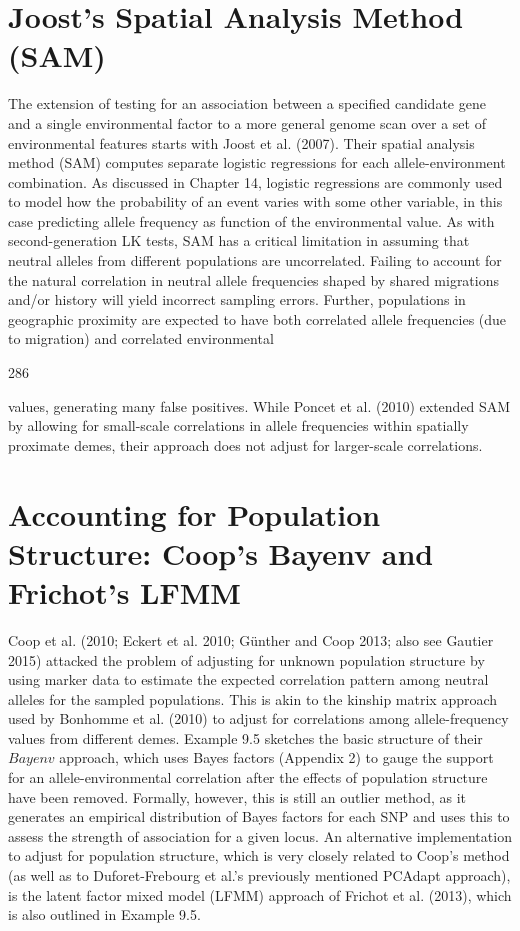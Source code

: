 \documentclass{article}
\begin{document}
\section{Joost's Spatial Analysis Method (SAM)}
The extension of testing for an association between a specified candidate gene and a single environmental factor to a more general genome scan over a set of environmental features starts with Joost et al. (2007). Their spatial analysis method (SAM) computes separate logistic regressions for each allele-environment combination. As discussed in Chapter 14, logistic regressions are commonly used to model how the probability of an event varies with some other variable, in this case predicting allele frequency as function of the environmental value. As with second-generation LK tests, SAM has a critical limitation in assuming that neutral alleles from different populations are uncorrelated. Failing to account for the natural correlation in neutral allele frequencies shaped by shared migrations and/or history will yield incorrect sampling errors. Further, populations in geographic proximity are expected to have both correlated allele frequencies (due to migration) and correlated environmental

286

values, generating many false positives. While Poncet et al. (2010) extended SAM by allowing for small-scale correlations in allele frequencies within spatially proximate demes, their approach does not adjust for larger-scale correlations.

\section{Accounting for Population Structure: Coop's Bayenv and Frichot's LFMM}
Coop et al. (2010; Eckert et al. 2010; Günther and Coop 2013; also see Gautier 2015) attacked the problem of adjusting for unknown population structure by using marker data to estimate the expected correlation pattern among neutral alleles for the sampled populations. This is akin to the kinship matrix approach used by Bonhomme et al. (2010) to adjust for correlations among allele-frequency values from different demes. Example 9.5 sketches the basic structure of their  $ Bayenv $ approach, which uses Bayes factors (Appendix 2) to gauge the support for an allele-environmental correlation after the effects of population structure have been removed. Formally, however, this is still an outlier method, as it generates an empirical distribution of Bayes factors for each SNP and uses this to assess the strength of association for a given locus. An alternative implementation to adjust for population structure, which is very closely related to Coop's method (as well as to Duforet-Frebourg et al.'s previously mentioned PCAdapt approach), is the latent factor mixed model (LFMM) approach of Frichot et al. (2013), which is also outlined in Example 9.5.
\end{document}

